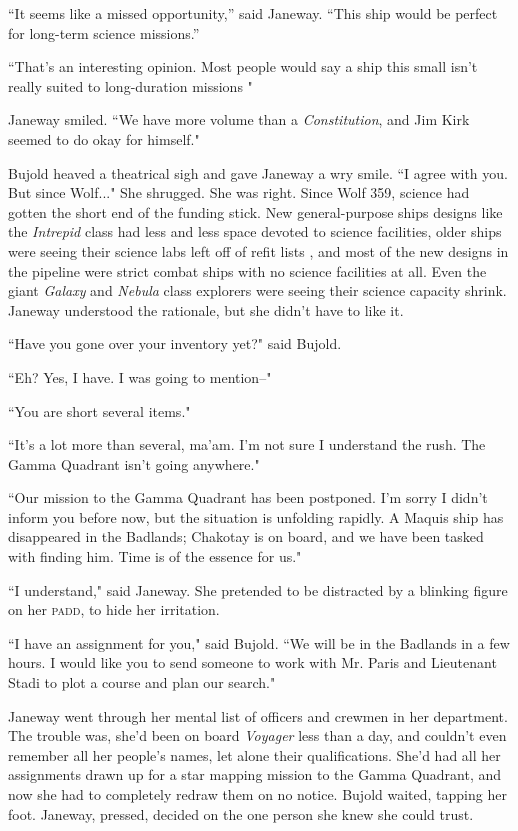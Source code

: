 \documentclass[twoside,letterpaper,12pt]{memoir}
\begin{document}
``It seems like a missed opportunity,'' said Janeway. ``This ship would be perfect for long-term science missions.''

``That’s an interesting opinion. Most people would say a ship this small isn't really suited to long-duration missions "

Janeway smiled. ``We have more volume than a \textit{Constitution}, and Jim Kirk seemed to do okay for himself."

Bujold heaved a theatrical sigh and gave Janeway a wry smile. ``I agree with you. But since Wolf..." She shrugged. She was right. Since Wolf 359, science had gotten the short end of the funding stick. New general-purpose ships designs like the \textit{Intrepid }class had less and less space devoted to science facilities, older ships were seeing their science labs left off of refit lists , and most of the new designs in the pipeline were strict combat ships with no science facilities at all. Even the giant \textit{Galaxy} and \textit{Nebula} class explorers were seeing their science capacity shrink. Janeway understood the rationale, but she didn't have to like it.

``Have you gone over your inventory yet?" said Bujold.

``Eh? Yes, I have. I was going to mention--"

``You are short several items."

``It's a lot more than several, ma'am. I'm not sure I understand the rush. The Gamma Quadrant isn't going anywhere."

``Our mission to the Gamma Quadrant has been postponed. I'm sorry I didn't inform you before now, but the situation is unfolding rapidly. A Maquis ship has disappeared in the Badlands; Chakotay is on board, and we have been tasked with finding him. Time is of the essence for us."

``I understand," said Janeway. She pretended to be distracted by a blinking figure on her \textsc{padd}, to hide her irritation.

``I have an assignment for you," said Bujold. ``We will be in the Badlands in a few hours. I would like you to send someone to work with Mr. Paris and Lieutenant Stadi to plot a course and plan our search."

Janeway went through her mental list of officers and crewmen in her department. The trouble was, she'd been on board \textit{Voyager} less than a day, and couldn't even remember all her people's names, let alone their qualifications. She'd had all her assignments drawn up for a star mapping mission to the Gamma Quadrant, and now she had to completely redraw them on no notice. Bujold waited, tapping her foot. Janeway, pressed, decided on the one person she knew she could trust.
\end{document}
